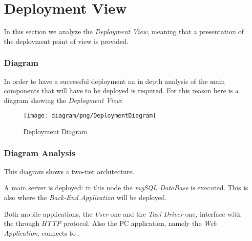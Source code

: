 \newpage

\section{Deployment View} %
\label{sec:deployment_view}

In this section we analyze the \emph{Deployment View}, meaning that a presentation of the deployment point of view is provided.

\subsubsection{Diagram} %
\label{ssub:diagram}

In order to have a successful deployment an in depth analysis of the main components that will have to be deployed is required.
For this reason here is a diagram showing the \emph{Deployment View}:
\newpage
\begin{figure}[h!t]
\caption{Deployment Diagram}
\texttt{[image: diagram/png/DeploymentDiagram]}
\centering
\end{figure}
\newpage


\subsubsection{Diagram Analysis} %
\label{ssub:diagram_analysis}

This diagram shows a two-tier architecture.

A main server is deployed: in this node the \emph{mySQL DataBase} is executed. This is also where the \emph{Back-End Application} will be deployed.

Both mobile applications, the \emph{User} one and the \emph{Taxi Driver} one, interface with the \emph{} through \emph{HTTP} protocol.
Also the PC application, namely the \emph{Web Application}, connects to \emph{}.
